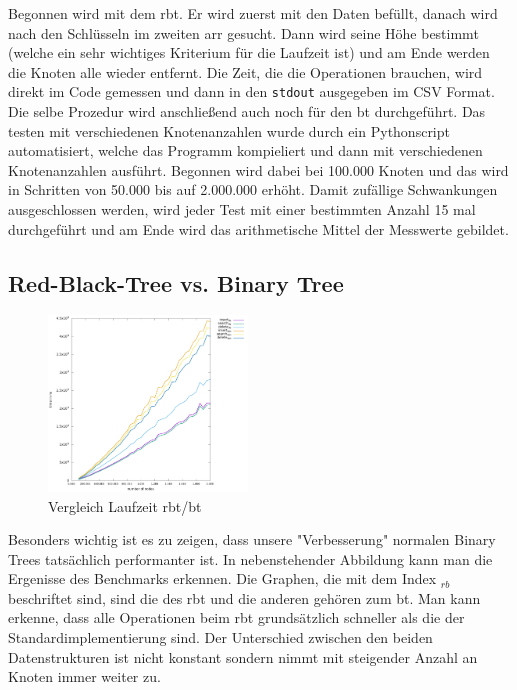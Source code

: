 \documentclass[11pt]{article}
\newcommand{\lstin}[1]{\lstinline[language=C]{#1}}
\begin{document}
Begonnen wird mit dem \gls{rbt}. Er wird zuerst mit den Daten befüllt, danach wird nach den Schlüsseln im zweiten \gls{arr} gesucht. Dann wird seine Höhe bestimmt (welche ein sehr wichtiges Kriterium für die Laufzeit ist) und am Ende werden die Knoten alle wieder entfernt.  
Die Zeit, die die Operationen brauchen, wird direkt im Code gemessen und dann in den \lstin{stdout} ausgegeben im CSV Format. Die selbe Prozedur wird anschließend auch noch für den \gls{bt} durchgeführt.
Das testen mit verschiedenen Knotenanzahlen wurde durch ein Pythonscript automatisiert, welche das Programm kompieliert und dann mit verschiedenen Knotenanzahlen ausführt. 
Begonnen wird dabei bei 100.000 Knoten und das wird in Schritten von 50.000 bis auf 2.000.000 erhöht. Damit zufällige Schwankungen ausgeschlossen werden, wird jeder Test mit einer bestimmten Anzahl 
15 mal durchgeführt und am Ende wird das arithmetische Mittel der Messwerte gebildet. 

\subsection{Red-Black-Tree vs. Binary Tree} \label{bbrbt}

\begin{figure}
  \includegraphics[width=200px]{../benchmark/compare_bin.png}
  \vspace{-20pt}
  \caption{Vergleich Laufzeit \gls{rbt}/\gls{bt}}
  \vspace{-15pt}
\end{figure}

Besonders wichtig ist es zu zeigen, dass unsere "Verbesserung" normalen Binary Trees tatsächlich performanter ist. In nebenstehender Abbildung kann man die Ergenisse des Benchmarks erkennen.
Die Graphen, die mit dem Index $_{rb}$ beschriftet sind, sind die des \gls{rbt} und die anderen gehören zum \gls{bt}.
Man kann erkenne, dass alle Operationen beim \gls{rbt} grundsätzlich schneller als die der Standardimplementierung sind. 
Der Unterschied zwischen den beiden Datenstrukturen ist nicht konstant sondern nimmt mit steigender Anzahl an Knoten immer weiter zu. 
\end{document}

